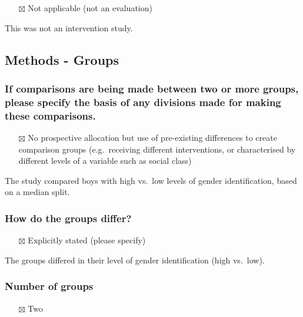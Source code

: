 \documentclass[
  doc, a4paper]{apa7}
\providecommand{\tightlist}{%
  \setlength{\itemsep}{0pt}\setlength{\parskip}{0pt}}
\begin{document}
\begin{itemize}
\tightlist
\item[$\boxtimes$]
  Not applicable (not an evaluation)
\end{itemize}

This was not an intervention study.

\subsection{Methods - Groups}\label{methods---groups}

\subsubsection{If comparisons are being made between two or more groups, please specify the basis of any divisions made for making these comparisons.}\label{if-comparisons-are-being-made-between-two-or-more-groups-please-specify-the-basis-of-any-divisions-made-for-making-these-comparisons.}

\begin{itemize}
\tightlist
\item[$\boxtimes$]
  No prospective allocation but use of pre-existing differences to create comparison groups (e.g.~receiving different interventions, or characterised by different levels of a variable such as social class)
\end{itemize}

The study compared boys with high vs.~low levels of gender identification, based on a median split.

\subsubsection{How do the groups differ?}\label{how-do-the-groups-differ}

\begin{itemize}
\tightlist
\item[$\boxtimes$]
  Explicitly stated (please specify)
\end{itemize}

The groups differed in their level of gender identification (high vs.~low).

\subsubsection{Number of groups}\label{number-of-groups}

\begin{itemize}
\tightlist
\item[$\boxtimes$]
  Two
\end{itemize}
\end{document}

